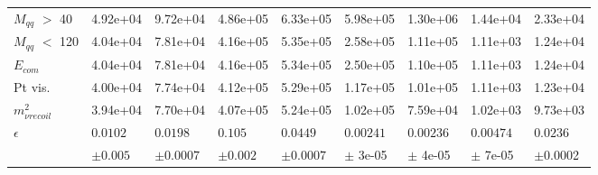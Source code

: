 \begin{table}
\begin{tabular}{|p{}|p{}p{}p{}p{}p{}p{}p{}p{}|}
$M_{qq}$ $>$ 40 & {4.92e+04 } &  {9.72e+04 } &  {4.86e+05} & {6.33e+05} &  {5.98e+05} &  {1.30e+06} &  {1.44e+04} &  {2.33e+04} \\ 

$M_{qq}$ $<$ 120 & {4.04e+04 } &  {7.81e+04 } &  {4.16e+05} & {5.35e+05} &  {2.58e+05} &  {1.11e+05} &  {1.11e+03} &  {1.24e+04} \\ 
 
$E_{com}$ & {4.04e+04 } &  {7.81e+04 } &  {4.16e+05} & {5.34e+05} &  {2.50e+05} &  {1.10e+05} &  {1.11e+03} &  {1.24e+04} \\ 

Pt vis. & {4.00e+04 } &  {7.74e+04 } &  {4.12e+05} & {5.29e+05} &  {1.17e+05} &  {1.01e+05} &  {1.11e+03} &  {1.23e+04} \\ 
 
$m^2_{\nu recoil}$ & {3.94e+04 } &  {7.70e+04 } &  {4.07e+05} & {5.24e+05} &  {1.02e+05} &  {7.59e+04} &  {1.02e+03} &  {9.73e+03} \\ 
\hline 
 $\epsilon$ & $0.0102 $ & $0.0198 $ & $0.105 $ &  $0.0449 $ & $0.00241 $ & $0.00236 $ & $0.00474 $ & $0.0236 $ \\ 

  	     & $\pm 0.005$ & $\pm 0.0007$ & $\pm 0.002$ & $\pm 0.0007$ & $\pm$ {3e-05} & $\pm$ {4e-05} & $\pm$ {7e-05} & $\pm$0.0002 \\

 \hline
 \end{tabular}

\end{table}



